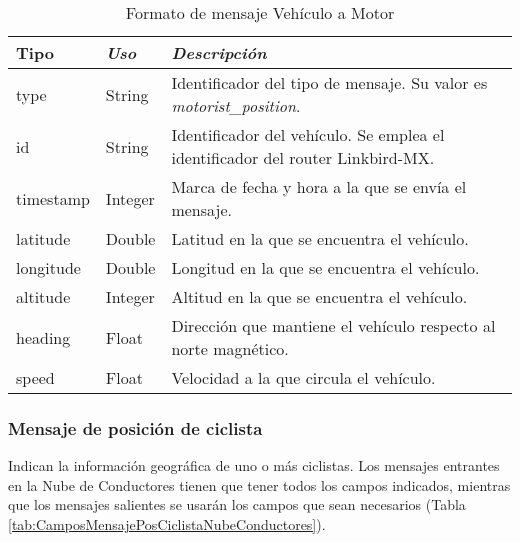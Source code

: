 \begin{table}[h]
	\centering
	\caption{Formato de mensaje Vehículo a Motor}
	\label{tab:CamposMensajePosVehMotNubeConductores}
	\begin{tabular}{lll}
		\toprule
			\textbf{Tipo} & \emph{Uso} & \emph{Descripción}\\
		\midrule
			type			&	String	&	Identificador del tipo de mensaje. Su valor es
														\emph{motorist\_position}.	\\
			id				&	String	&	Identificador del vehículo. Se emplea el
														identificador del router Linkbird-MX.	\\
			timestamp	&	Integer	&	Marca de fecha y hora a la que se envía el mensaje.	\\
			latitude	&	Double	&	Latitud en la que se encuentra el vehículo. \\
			longitude	&	Double	&	Longitud en la que se encuentra el vehículo.	\\
			altitude	&	Integer	&	Altitud en la que se encuentra el vehículo.	\\
			heading		&	Float		&	Dirección que mantiene el vehículo respecto al
														norte magnético.	\\
			speed			&	Float		&	Velocidad a la que circula el vehículo.	\\
		\bottomrule
	\end{tabular}
\end{table}
\FloatBarrier
\subsubsection{Mensaje de posición de ciclista}\label{sssection:MensajePosCiclista}
Indican la información geográfica de uno o más ciclistas. Los mensajes entrantes
en la Nube de Conductores tienen que tener todos los campos indicados, mientras
que los mensajes salientes se usarán los campos que sean necesarios (Tabla
\ref{tab:CamposMensajePosCiclistaNubeConductores}).

